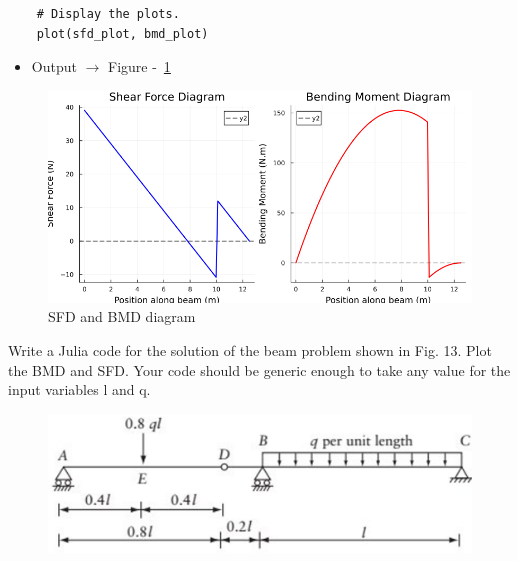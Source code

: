 \documentclass{homework}
\begin{document}
\begin{solution}
\begin{verbatim}
    # Display the plots.
    plot(sfd_plot, bmd_plot)
    \end{verbatim}
    
    \begin{itemize}
        \item Output $\rightarrow$ Figure -~\ref{fig:sbd-bmd-1}
    \end{itemize}
    
    \begin{figure}[H]
        \centering
        \includegraphics[width=0.5\linewidth]{media/sbd-bmd-1.png}
        \caption{SFD and BMD diagram}
        \label{fig:sbd-bmd-1}
    \end{figure}   
\end{solution}

\question  Write a Julia code for the solution of the beam problem shown in Fig. 13. Plot the BMD and SFD. Your code should be generic enough to take any value for the input variables l and q.
\begin{figure}[H]
    \centering
    \includegraphics[width=0.5\linewidth]{media/figure-2.png}
    \caption{\empty}
    \label{fig:figure-2}
\end{figure}
\end{document}
